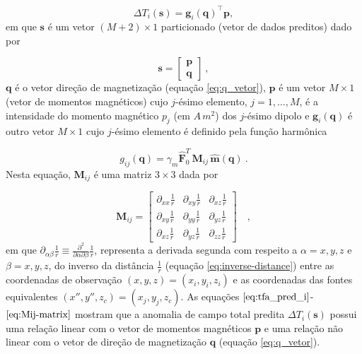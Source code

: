 \begin{equation}
\Delta T_{i}(\mathbf{s}) = \mathbf{g}_{i}(\mathbf{q})^{\top} \mathbf{p},
\label{eq:tfa_pred_i}
\end{equation}
em que $\mathbf{s}$ é um vetor $(M + 2) \times 1$ particionado (vetor de dados preditos) dado por 

\begin{equation}
      \mathbf{s} = \begin{bmatrix}
		\mathbf{p} \\
		\mathbf{q}
	\end{bmatrix} \: ,
	\label{eq:parameter-vector}
\end{equation}
$\mathbf{q}$ é o vetor direção de magnetização (equação \ref{eq:q_vetor}), $\mathbf{p}$ é um vetor $M \times 1$ (vetor de momentos magnéticos) cujo $j$-ésimo elemento, $j=1,\dots,M$, é a intensidade do momento magnético $p_{j}$ (em $A \, m^{2}$) dos $j$-ésimo dipolo e $\mathbf{g}_{i} (\mathbf{q})$ é outro vetor $M \times 1$ cujo $j$-ésimo elemento é definido pela função harmônica 

\begin{equation}
g_{ij} (\mathbf{q})  = \gamma_m \hat{\mathbf{F}}_{0}^T \, 
\mathbf{M}_{ij} \, \hat{\mathbf{m}}(\mathbf{q}) \: .
\label{eq:g_ij}
\end{equation}
Nesta equação, $\mathbf{M}_{ij}$ é uma matriz $3 \times 3$ dada por 

\begin{equation}
\mathbf{M}_{ij} = \begin{bmatrix}
\partial_{xx} \frac{1}{r} & 
\partial_{xy} \frac{1}{r} &
\partial_{xz} \frac{1}{r} \\
\partial_{xy} \frac{1}{r} & 
\partial_{yy} \frac{1}{r} &
\partial_{yz} \frac{1}{r} \\
\partial_{xz} \frac{1}{r} & 
\partial_{yz} \frac{1}{r} &
\partial_{zz} \frac{1}{r}
\end{bmatrix} \quad ,
\label{eq:Mij-matrix}
\end{equation}
em que $\partial_{\alpha\beta} \frac{1}{r} \equiv \frac{\partial^{2}}{\partial \alpha \partial \beta} \frac{1}{r}$, representa a derivada segunda com respeito a $\alpha = x, y, z$ e $\beta = x, y, z$, do inverso da distância $\frac{1}{r}$ (equação \ref{eq:inverse-distance}) entre as coordenadas de observação $(x, y, z) = (x_{i}, y_{i}, z_{i})$ e as coordenadas das fontes equivalentes $(x'', y'', z_{c}) = (x_{j}, y_{j}, z_{c})$. As equações $\ref{eq:tfa_pred_i}$-$\ref{eq:Mij-matrix}$ mostram que a anomalia de campo total predita $\Delta T_{i}(\mathbf{s})$ possui uma relação linear com o vetor de momentos magnéticos $\mathbf{p}$ e uma relação não linear com o vetor de direção de magnetização $\mathbf{q}$ (equação \ref{eq:q_vetor}).

